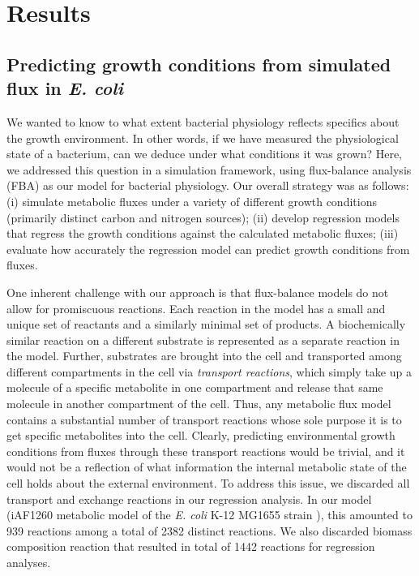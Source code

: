 \documentclass[12pt]{article}
\begin{document}
\section*{Results}

\subsection*{Predicting growth conditions from simulated flux in \emph{E. coli}}

We wanted to know to what extent bacterial physiology reflects specifics about the growth environment. In other words, if we have measured the physiological state of a bacterium, can we deduce under what conditions it was grown? Here, we addressed this question in a simulation framework, using flux-balance analysis (FBA) as our model for bacterial physiology. Our overall strategy was as follows: (i) simulate metabolic fluxes under a variety of different growth conditions (primarily distinct carbon and nitrogen sources); (ii) develop regression models that regress the growth conditions against the calculated metabolic fluxes; (iii) evaluate how accurately the regression model can predict growth conditions from fluxes.

One inherent challenge with our approach is that flux-balance models do not allow for promiscuous reactions. Each reaction in the model has a small and unique set of reactants and a similarly minimal set of products. A biochemically similar reaction on a different substrate is represented as a separate reaction in the model. Further, substrates are brought into the cell and transported among different compartments in the cell via \emph{transport reactions}, which simply take up a molecule of a specific metabolite in one compartment and release that same molecule in another compartment of the cell. Thus, any metabolic flux model contains a substantial number of transport reactions whose sole purpose it is to get specific metabolites into the cell. Clearly, predicting environmental growth conditions from fluxes through these transport reactions would be trivial, and it would not be a reflection of what information the internal metabolic state of the cell holds about the external environment. To address this issue, we discarded all transport and exchange reactions in our regression analysis. In our model (iAF1260 metabolic model of the \emph{E. coli} K-12 MG1655 strain \cite{Schellenbergeretal2010}), this amounted to 939 reactions among a total of 2382 distinct reactions. We also discarded biomass composition reaction that resulted in total of 1442 reactions for regression analyses.
\end{document}
